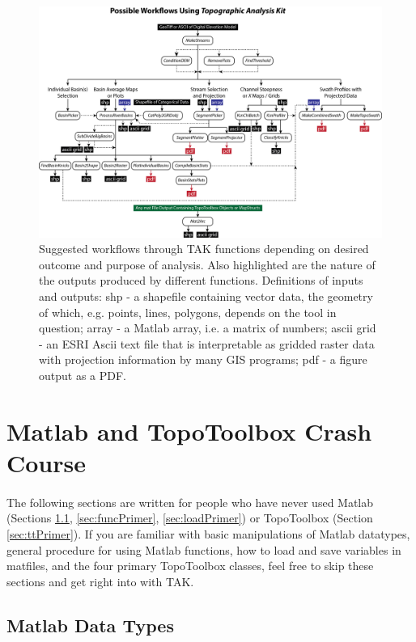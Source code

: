 \begin{figure}[H]
	\includegraphics[width=16.5cm]{PNGs/FlowChart.png}
	\caption{Suggested workflows through TAK functions depending on desired outcome and purpose of analysis. Also highlighted are the nature of the outputs produced by different functions. Definitions of inputs and outputs: shp - a shapefile containing vector data, the geometry of which, e.g. points, lines, polygons, depends on the tool in question; array - a Matlab array, i.e. a matrix of numbers; ascii grid - an ESRI Ascii text file that is interpretable as gridded raster data with projection information by many GIS programs; pdf - a figure output as a PDF.}
	\label{fig:Workflow}
\end{figure}

\section{Matlab and TopoToolbox Crash Course} \label{sec:primer}
\paragraph{}The following sections are written for people who have never used Matlab (Sections \ref{sec:dataPrimer}, \ref{sec:funcPrimer}, \ref{sec:loadPrimer}) or TopoToolbox (Section \ref{sec:ttPrimer}). If you are familiar with basic manipulations of Matlab datatypes,  general procedure for using Matlab functions, how to load and save variables in matfiles, and the four primary TopoToolbox classes, feel free to skip these sections and get right into  with TAK.

\subsection{Matlab Data Types} \label{sec:dataPrimer}
